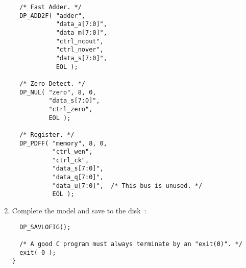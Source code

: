 \begin{enumerate}
{\begin{verbatim}
  /* Fast Adder. */
  DP_ADD2F( "adder",
            "data_a[7:0]",
            "data_m[7:0]",
            "ctrl_ncout",
            "ctrl_nover",
            "data_s[7:0]",
            EOL );

  /* Zero Detect. */
  DP_NUL( "zero", 8, 0,
          "data_s[7:0]",
          "ctrl_zero",
          EOL );

  /* Register. */
  DP_PDFF( "memory", 8, 0,
           "ctrl_wen",
           "ctrl_ck",
           "data_s[7:0]",
           "data_q[7:0]",
           "data_u[7:0]",  /* This bus is unused. */
           EOL );
       \end{verbatim} \rm }
       \pagebreak[1]
       \item Complete the model and save to the disk~:
       { \tt \begin{verbatim}
  DP_SAVLOFIG();

  /* A good C program must always terminate by an "exit(0)". */
  exit( 0 );
}
       \end{verbatim} \rm }
     \end{enumerate}
